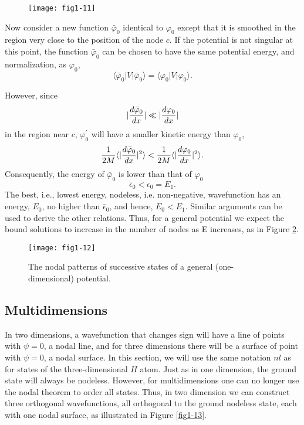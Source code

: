 \begin{figure}
\texttt{[image: fig1-11]}
\caption{}
\label{fig1-11}
\end{figure}

Now consider a new function ${\bar \varphi}_0$ identical to $\varphi_0$ 
except that it is smoothed in the region very close to the position of the 
node $c$. If the potential is not singular at this point,
the function ${\bar \varphi}_0$ can be chosen to have the same potential 
energy, and normalization, as $\varphi_0$,
\begin{equation}
\langle {\bar \varphi}_0 \vert V \vert {\bar \varphi}_0 \rangle = \langle 
\varphi_0 \vert V \vert \varphi_0 \rangle.
\label{eq_hpp}
\end{equation}

However, since
\begin{equation}
\vert {d {\bar \varphi}_0 \over dx} \vert \ll \vert {d \varphi_0 \over dx} 
\vert
\end{equation}
in the region near $c$, $\varphi^{\prime}_0$ will have a smaller kinetic 
energy than $\varphi_0$,
\begin{equation}
{1 \over 2M} \langle \vert {d {\bar \varphi}_0 \over dx} \vert^2
\rangle < 
{1 \over 2M} \langle \vert {d \varphi_0 \over dx} \vert^2 \rangle.
\label{eq_1ov2m}
\end{equation}
Consequently, the energy of ${\bar \varphi}_0$ is lower than that of 
$\varphi_0$
\begin{equation}
{\bar \epsilon}_0 < \epsilon_0 = E_1.
\label{eq_eps0}
\end{equation}
The best, i.e., lowest energy, nodeless, i.e. non-negative, wavefunction has an
energy, $E_0$, no higher than ${\bar \epsilon}_0$, and hence, $E_0 < 
E_1$. Similar arguments can be used to derive the other relations. Thus, 
for a general potential we expect the bound solutions to increase in
the number of nodes as E increases, as in Figure \ref{fig1-12}.

\begin{figure}
\texttt{[image: fig1-12]}
\caption{The nodal patterns of successive states of a general
(one-dimensional) potential.}
\label{fig1-12}
\end{figure}

\subsection{Multidimensions}
    
In two dimensions, a wavefunction that changes sign will have a line
of points with $\psi = 0$, a nodal line, and for three dimensions
there will be a surface of point with $\psi = 0$, a nodal surface. In
this section, we will use the same notation $nl$ as for states of the
three-dimensional $H$ atom. Just as in one dimension, the ground state
will always be nodeless. However, for multidimensions one can no
longer use the nodal theorem to order all states.  Thus, in two
dimension we can construct three orthogonal wavefunctions, all
orthogonal to the ground nodeless state, each with one nodal surface,
as illustrated in Figure \ref{fig1-13}.

